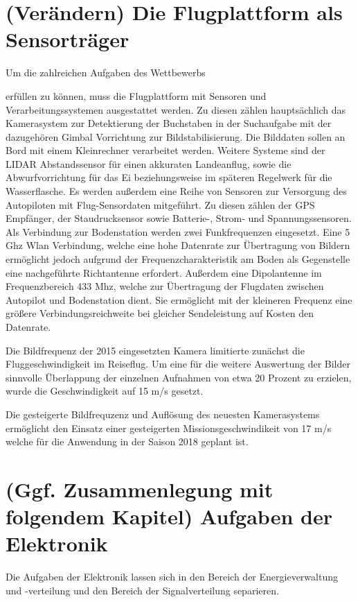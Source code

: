 \section{(Verändern) Die Flugplattform als Sensorträger}

Um die zahlreichen Aufgaben des Wettbewerbs \begin{comment} Verweis auf Wettbewerbsaufgaben \end{comment}
erfüllen zu können, muss die Flugplattform mit Sensoren und Verarbeitungssystemen ausgestattet werden.
Zu diesen zählen hauptsächlich das Kamerasystem zur Detektierung der Buchstaben in der Suchaufgabe mit der dazugehören Gimbal Vorrichtung zur Bildstabilisierung. Die Bilddaten sollen an Bord mit einem Kleinrechner  verarbeitet werden. Weitere Systeme sind der LIDAR Abstandssensor für einen akkuraten Landeanflug, sowie die Abwurfvorrichtung für das Ei beziehungsweise im späteren Regelwerk für die Wasserflasche.
Es werden außerdem eine Reihe von Sensoren zur Versorgung des Autopiloten mit Flug-Sensordaten mitgeführt. Zu diesen zählen der GPS Empfänger, der Staudrucksensor sowie Batterie-, Strom- und Spannungssensoren.
Als Verbindung zur Bodenstation werden zwei Funkfrequenzen eingesetzt.
Eine 5 Ghz Wlan Verbindung, welche eine hohe Datenrate zur Übertragung von Bildern ermöglicht jedoch aufgrund der Frequenzcharakteristik am Boden als Gegenstelle eine nachgeführte Richtantenne erfordert.
Außerdem eine Dipolantenne im Frequenzbereich 433 Mhz, welche zur Übertragung der Flugdaten zwischen Autopilot und Bodenstation dient. Sie ermöglicht mit der kleineren Frequenz eine größere Verbindungsreichweite bei gleicher Sendeleistung auf Kosten den Datenrate.

Die Bildfrequenz der 2015 eingesetzten Kamera limitierte zunächst die Fluggeschwindigkeit im Reiseflug. Um eine für die weitere Auswertung der Bilder sinnvolle Überlappung der einzelnen Aufnahmen von etwa 20 Prozent zu erzielen, wurde die Geschwindigkeit auf 15 m/s gesetzt.

Die gesteigerte Bildfrequzenz und Auflösung des neuesten Kamerasystems ermöglicht den Einsatz einer gesteigerten Missionsgeschwindikeit von 17 m/s welche für die Anwendung in der Saison 2018 geplant ist.

\section{(Ggf. Zusammenlegung mit folgendem Kapitel) Aufgaben der Elektronik}

Die Aufgaben der Elektronik lassen sich in den Bereich der Energieverwaltung und -verteilung  und den Bereich der Signalverteilung separieren.

